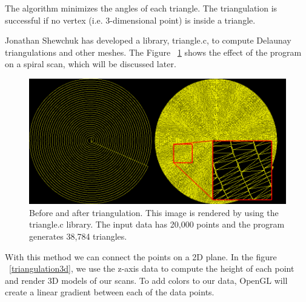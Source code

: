 The algorithm minimizes the angles of each triangle. The triangulation is successful if no vertex (i.e. 3-dimensional point) is inside a triangle.

Jonathan Shewchuk \cite{shewchuk96b} has developed a library, triangle.c, to compute Delaunay triangulations and other meshes. The Figure ~\ref{triangulation2d} shows the effect of the program on a spiral scan, which will be discussed later. 
\begin{figure}[!ht]
  \centering
  \includegraphics[scale=0.45]{images/triangulation.png}
    \caption{Before and after triangulation. This image is rendered by using the triangle.c library. The input data has 20,000 points and the program generates 38,784 triangles.}
  \label{triangulation2d}
\end{figure}

With this method we can connect the points on a 2D plane. In the figure  ~\ref{triangulation3d}, we use the z-axis data to compute the height of each point and render 3D models of our scans. To add colors to our data, OpenGL will create a linear gradient between each of the data points.

